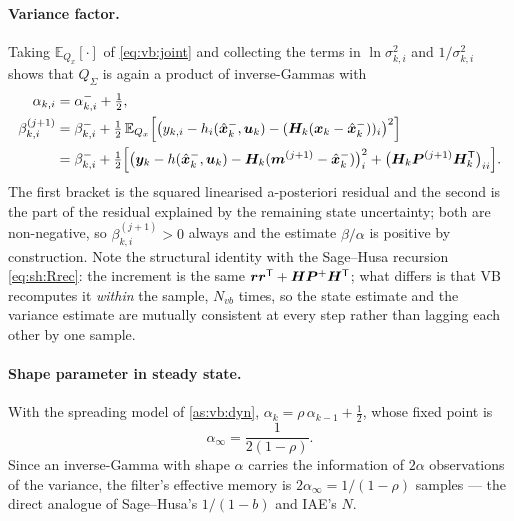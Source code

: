 \paragraph{Variance factor.}  Taking $\mathbb{E}_{Q_x}\!\left[\cdot\right]$ of \eqref{eq:vb:joint} and collecting the
terms in $\ln\sigma^2_{k,i}$ and $1/\sigma^2_{k,i}$ shows that $Q_\Sigma$ is again a product of
inverse-Gammas with
\begin{align}
\alpha_{k,i} &= \alpha^-_{k,i} + \tfrac12, \label{eq:vb:alpha}\\
\beta^{(j+1)}_{k,i} &= \beta^-_{k,i} + \tfrac12\,\mathbb{E}_{Q_x}\!\left[\big(y_{k,i}-h_i(\hat{\bm{x}}^{-}_k,\bm{u}_k)-(\bm{H}_k(\bm{x}_k-\hat{\bm{x}}^{-}_k))_i\big)^2\right] \nonumber\\
&= \beta^-_{k,i} + \tfrac12\Big[\big(\bm{y}_k-h(\hat{\bm{x}}^{-}_k,\bm{u}_k)-\bm{H}_k(\bm m^{(j+1)}-\hat{\bm{x}}^{-}_k)\big)_i^2
   + \big(\bm{H}_k\bm{P}^{(j+1)}\bm{H}_k^{\mathsf{T}}\big)_{ii}\Big].
\label{eq:vb:beta}
\end{align}
The first bracket is the squared linearised a-posteriori residual and the second is the part of the
residual explained by the remaining state uncertainty; both are non-negative, so
$\beta^{(j+1)}_{k,i}>0$ always and the estimate $\beta/\alpha$ is positive by construction.
Note the structural identity with the Sage--Husa recursion \eqref{eq:sh:Rrec}: the increment is the
same $\bm{r}\bm{r}^{\mathsf{T}} + \bm{H}\bm{P}^+\bm{H}^{\mathsf{T}}$; what differs is that VB recomputes it \emph{within} the sample,
$N_{vb}$ times, so the state estimate and the variance estimate are mutually consistent at every
step rather than lagging each other by one sample.

\paragraph{Shape parameter in steady state.}  With the spreading model of \cref{as:vb:dyn},
$\alpha_{k}=\rho\,\alpha_{k-1}+\tfrac12$, whose fixed point is
\begin{equation}
\alpha_\infty = \frac{1}{2(1-\rho)} .
\label{eq:vb:alphainf}
\end{equation}
Since an inverse-Gamma with shape $\alpha$ carries the information of $2\alpha$ observations of the
variance, the filter's effective memory is $2\alpha_\infty = 1/(1-\rho)$ samples --- the direct
analogue of Sage--Husa's $1/(1-b)$ and IAE's $N$.

